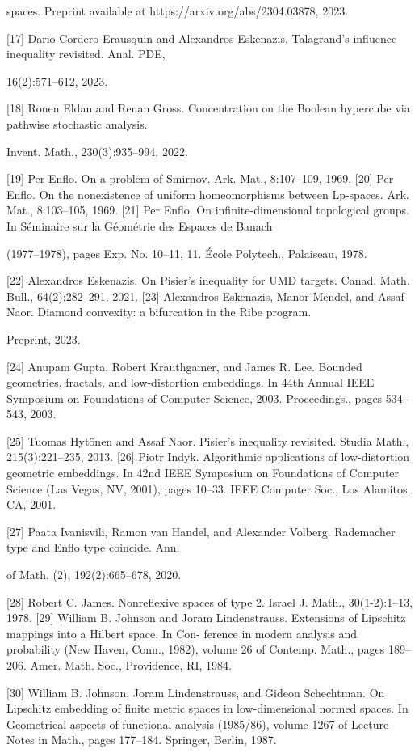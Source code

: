 {spaces. Preprint available at https://arxiv.org/abs/2304.03878, 2023.

[17] Dario Cordero-Erausquin and Alexandros Eskenazis. Talagrand’s inﬂuence inequality revisited. Anal. PDE,

16(2):571–612, 2023.

[18] Ronen Eldan and Renan Gross. Concentration on the Boolean hypercube via pathwise stochastic analysis.

Invent. Math., 230(3):935–994, 2022.

[19] Per Enﬂo. On a problem of Smirnov. Ark. Mat., 8:107–109, 1969.
[20] Per Enﬂo. On the nonexistence of uniform homeomorphisms between Lp-spaces. Ark. Mat., 8:103–105, 1969.
[21] Per Enﬂo. On inﬁnite-dimensional topological groups. In Séminaire sur la Géométrie des Espaces de Banach

(1977–1978), pages Exp. No. 10–11, 11. École Polytech., Palaiseau, 1978.

[22] Alexandros Eskenazis. On Pisier’s inequality for UMD targets. Canad. Math. Bull., 64(2):282–291, 2021.
[23] Alexandros Eskenazis, Manor Mendel, and Assaf Naor. Diamond convexity: a bifurcation in the Ribe program.

Preprint, 2023.

[24] Anupam Gupta, Robert Krauthgamer, and James R. Lee. Bounded geometries, fractals, and low-distortion
embeddings. In 44th Annual IEEE Symposium on Foundations of Computer Science, 2003. Proceedings., pages
534–543, 2003.

[25] Tuomas Hytönen and Assaf Naor. Pisier’s inequality revisited. Studia Math., 215(3):221–235, 2013.
[26] Piotr Indyk. Algorithmic applications of low-distortion geometric embeddings. In 42nd IEEE Symposium on
Foundations of Computer Science (Las Vegas, NV, 2001), pages 10–33. IEEE Computer Soc., Los Alamitos, CA,
2001.

[27] Paata Ivanisvili, Ramon van Handel, and Alexander Volberg. Rademacher type and Enﬂo type coincide. Ann.

of Math. (2), 192(2):665–678, 2020.

[28] Robert C. James. Nonreﬂexive spaces of type 2. Israel J. Math., 30(1-2):1–13, 1978.
[29] William B. Johnson and Joram Lindenstrauss. Extensions of Lipschitz mappings into a Hilbert space. In Con-
ference in modern analysis and probability (New Haven, Conn., 1982), volume 26 of Contemp. Math., pages
189–206. Amer. Math. Soc., Providence, RI, 1984.

[30] William B. Johnson, Joram Lindenstrauss, and Gideon Schechtman. On Lipschitz embedding of ﬁnite metric
spaces in low-dimensional normed spaces. In Geometrical aspects of functional analysis (1985/86), volume 1267
of Lecture Notes in Math., pages 177–184. Springer, Berlin, 1987.

}
